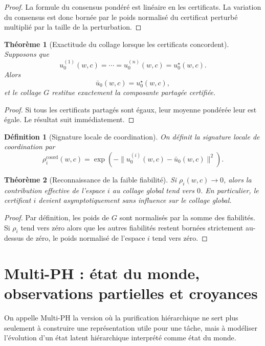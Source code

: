 \documentclass[11pt,a4paper]{article}
\newtheorem{definition}{Définition}[section]
\newtheorem{theorem}{Théorème}[section]
\newcommand{\1}{\mathbf 1}
\begin{document}
\begin{proof}
La formule du consensus pondéré est linéaire en les certificats.  
La variation du consensus est donc bornée par le poids normalisé du certificat perturbé multiplié par la taille de la perturbation.
\end{proof}

\begin{theorem}[Exactitude du collage lorsque les certificats concordent]
Supposons que
\[
u_0^{(1)}(w,c)=\cdots=u_0^{(n)}(w,c)=u_0^\star(w,c).
\]
Alors
\[
\bar u_0(w,c)=u_0^\star(w,c),
\]
et le collage \(G\) restitue exactement la composante partagée certifiée.
\end{theorem}

\begin{proof}
Si tous les certificats partagés sont égaux, leur moyenne pondérée leur est égale.  
Le résultat suit immédiatement.
\end{proof}

\begin{definition}[Signature locale de coordination]
On définit la signature locale de coordination par
\[
\rho_i^{\mathrm{coord}}(w,c)
=
\exp\!\left(-\|u_0^{(i)}(w,c)-\bar u_0(w,c)\|^2\right).
\]
\end{definition}

\begin{theorem}[Reconnaissance de la faible fiabilité]
Si \(\rho_i(w,c)\to 0\), alors la contribution effective de l'espace \(i\) au collage global tend vers \(0\).  
En particulier, le certificat \(i\) devient asymptotiquement sans influence sur le collage global.
\end{theorem}

\begin{proof}
Par définition, les poids de \(G\) sont normalisés par la somme des fiabilités.  
Si \(\rho_i\) tend vers zéro alors que les autres fiabilités restent bornées strictement au-dessus de zéro, le poids normalisé de l'espace \(i\) tend vers zéro.
\end{proof}

\section{Multi-PH : état du monde, observations partielles et croyances}

On appelle Multi-PH la version où la purification hiérarchique ne sert plus seulement à construire une représentation utile pour une tâche, mais à modéliser l'évolution d'un état latent hiérarchique interprété comme état du monde.
\end{document}
